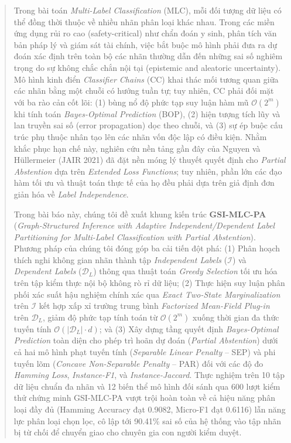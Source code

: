 \documentclass[11pt,a4paper]{article}
\begin{document}
\begin{abstract}
\noindent Trong bài toán \textit{Multi-Label Classification} (MLC), mỗi đối tượng dữ liệu có thể đồng thời thuộc về nhiều nhãn phân loại khác nhau. Trong các miền ứng dụng rủi ro cao (safety-critical) như chẩn đoán y sinh, phân tích văn bản pháp lý và giám sát tài chính, việc bắt buộc mô hình phải đưa ra dự đoán xác định trên toàn bộ các nhãn thường dẫn đến những sai số nghiêm trọng do sự không chắc chắn nội tại (epistemic and aleatoric uncertainty). Mô hình kinh điển \textit{Classifier Chains} (CC) khai thác mối tương quan giữa các nhãn bằng một chuỗi có hướng tuần tự; tuy nhiên, CC phải đối mặt với ba rào cản cốt lõi: (1) bùng nổ độ phức tạp suy luận hàm mũ $\mathcal{O}(2^m)$ khi tính toán \textit{Bayes-Optimal Prediction} (BOP), (2) hiện tượng tích lũy và lan truyền sai số (error propagation) dọc theo chuỗi, và (3) sự ép buộc cấu trúc phụ thuộc nhân tạo lên các nhãn vốn độc lập có điều kiện. Nhằm khắc phục hạn chế này, nghiên cứu nền tảng gần đây của Nguyen và H\"ullermeier (JAIR 2021) đã đặt nền móng lý thuyết quyết định cho \textit{Partial Abstention} dựa trên \textit{Extended Loss Functions}; tuy nhiên, phần lớn các đạo hàm tối ưu và thuật toán thực tế của họ đều phải dựa trên giả định đơn giản hóa về \textit{Label Independence}. 

Trong bài báo này, chúng tôi đề xuất khung kiến trúc \textbf{GSI-MLC-PA} (\textit{Graph-Structured Inference with Adaptive Independent/Dependent Label Partitioning for Multi-Label Classification with Partial Abstention}). Phương pháp của chúng tôi đóng góp ba cải tiến đột phá: (1) Phân hoạch thích nghi không gian nhãn thành tập \textit{Independent Labels} ($\mathcal{I}$) và \textit{Dependent Labels} ($\mathcal{D}_L$) thông qua thuật toán \textit{Greedy Selection} tối ưu hóa trên tập kiểm thực nội bộ không rò rỉ dữ liệu; (2) Thực hiện suy luận phân phối xác suất hậu nghiệm chính xác qua \textit{Exact Two-State Marginalization} trên $\mathcal{I}$ kết hợp xấp xỉ trường trung bình \textit{Factorized Mean-Field Plug-in} trên $\mathcal{D}_L$, giảm độ phức tạp tính toán từ $\mathcal{O}(2^m)$ xuống thời gian đa thức tuyến tính $\mathcal{O}(|\mathcal{D}_L| \cdot d)$; và (3) Xây dựng tầng quyết định \textit{Bayes-Optimal Prediction} toàn diện cho phép trì hoãn dự đoán (\textit{Partial Abstention}) dưới cả hai mô hình phạt tuyến tính (\textit{Separable Linear Penalty} -- SEP) và phi tuyến lõm (\textit{Concave Non-Separable Penalty} -- PAR) đối với các độ đo \textit{Hamming Loss}, \textit{Instance-F1}, và \textit{Instance-Jaccard}. Thực nghiệm trên 10 tập dữ liệu chuẩn đa nhãn và 12 biến thể mô hình đối sánh qua 600 lượt kiểm thử chứng minh GSI-MLC-PA vượt trội hoàn toàn về cả hiệu năng phân loại đầy đủ (Hamming Accuracy đạt 0.9082, Micro-F1 đạt 0.6116) lẫn năng lực phân loại chọn lọc, cô lập tới 90.41\% sai số của hệ thống vào tập nhãn bị từ chối để chuyển giao cho chuyên gia con người kiểm duyệt.
\end{abstract}
\end{document}
